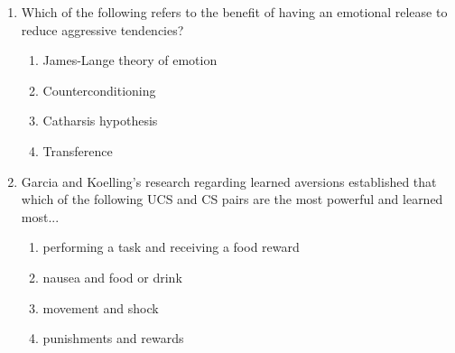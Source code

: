 \documentclass[12pt]{article}
\begin{document}
\begin{enumerate}[label=\arabic*.]
\begin{enumerate}[label=(\alph*)]
\end{enumerate}
\item Which of the following refers to the benefit of having an emotional release to reduce aggressive tendencies?
\begin{enumerate}[label=(\alph*)]
    \item James-Lange theory of emotion
    \item Counterconditioning
    \item Catharsis hypothesis
    \item Transference
\end{enumerate}
\item Garcia and Koelling's research regarding learned aversions established that which of the following UCS and CS pairs are the most powerful and learned most...
\begin{enumerate}[label=(\alph*)]
    \item performing a task and receiving a food reward
    \item nausea and food or drink
    \item movement and shock
    \item punishments and rewards
\end{enumerate}
\end{enumerate}
\end{document}
